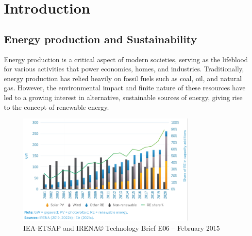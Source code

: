 
\chapter{Introduction}  %

\ifpdf
    \graphicspath{{Chapter1/Figs/Raster/}{Chapter1/Figs/PDF/}{Chapter1/Figs/}}
\else
    \graphicspath{{Chapter1/Figs/Vector/}{Chapter1/Figs/}}
\fi

\section{Energy production and Sustainability\label{section1.1}}

Energy production is a critical aspect of modern societies, serving as the lifeblood for various activities that power economies, homes, and industries. Traditionally, energy production has relied heavily on fossil fuels such as coal, oil, and natural gas. However, the environmental impact and finite nature of these resources have led to a growing interest in alternative, sustainable sources of energy, giving rise to the concept of renewable energy.

\begin{figure}[htbp!] 
    \centering    
    \includegraphics[width=0.8\textwidth]{01_fig_energy_production.pdf}
    \caption{IEA-ETSAP and IRENA© Technology Brief E06 – February 2015}
    \label{fig:production_energy_world}
\end{figure}

